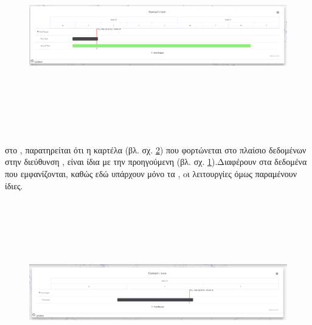 \begin{figure}[!htb]
\includegraphics[width=\columnwidth, height=8cm]{images/userTasks.png}
\caption{}
\label{fig:userTasks}
\end{figure}

\subsubsection*{}
 στο , παρατηρείται ότι η καρτέλα (βλ. σχ. \ref{fig:userIssues}) που φορτώνεται στο πλαίσιο δεδομένων στην διεύθυνση , είναι ίδια με την προηγούμενη (βλ. σχ. \ref{fig:userTasks}).Διαφέρουν στα δεδομένα που εμφανίζονται, καθώς εδώ υπάρχουν μόνο τα , oι λειτουργίες όμως παραμένουν ίδιες.

\begin{figure}[!htb]
\includegraphics[width=\columnwidth, height=8cm]{images/userIssues.png}
\caption{}
\label{fig:userIssues}
\end{figure}

